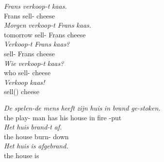\begin{exe}
\ex
\begin{xlist}
\ex\label{gloss:simple_smain}
\gll \textit{Frans} \textit{verkoop-t} \textit{kaas.}\\
Frans sell- cheese\\
\ex\label{gloss:simple_smain_v2}
\gll \textit{Morgen} \textit{verkoop-t} \textit{Frans} \textit{kaas.}\\
tomorrow sell- Frans cheese\\
\ex\label{gloss:simple_sv1_q}
\gll \textit{Verkoop-t} \textit{Frans} \textit{kaas?}\\
sell- Frans cheese\\
\ex\label{gloss:simple_whq}
\gll \textit{Wie} \textit{verkoop-t} \textit{kaas?}\\
who sell- cheese\\
\ex\label{gloss:simple_sv1_imp}
\gll \textit{Verkoop} \textit{kaas!}\\
sell() cheese\\
\end{xlist}
\end{exe}

\begin{exe}
\ex
\begin{xlist}
\ex\label{gloss:prs_ptcp}
\gll \textit{De} \textit{spelen-de} \textit{mens} \textit{heeft} \textit{zijn} \textit{huis} \textit{in} \textit{brand} \textit{ge-stoken.}\\
the play- man has his house in fire -put\\
\ex\label{gloss:svp}
\gll \textit{Het} \textit{huis} \textit{brand-t} \textit{af}.\\
the {house} {burn}- down\\
\ex\label{gloss:pst_ptcp}
\gll \textit{Het} \textit{huis} \textit{is} \textit{af\textlangle ge\textrangle brand.}\\
the {house} {is} \textlangle{}\\
\end{xlist}
\end{exe}

